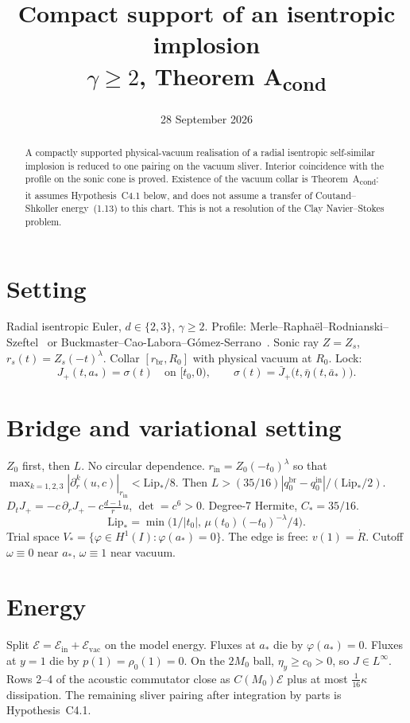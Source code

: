 \documentclass{amsart}
\title[Compact support of an isentropic implosion]{Compact support of an isentropic implosion\\
{\large $\gamma\ge 2$, Theorem A\textsubscript{cond}}}
\author{}
\date{28 September 2026}
\theoremstyle{plain}
\theoremstyle{definition}
\begin{document}
\begin{abstract}
A compactly supported physical-vacuum realisation of a radial isentropic
self-similar implosion is reduced to one pairing on the vacuum sliver.
Interior coincidence with the profile on the sonic cone is proved.
Existence of the vacuum collar is Theorem~A\textsubscript{cond}:
it assumes Hypothesis~C4.1 below, and does not assume a transfer of
Coutand--Shkoller energy~(1.13) to this chart.
This is not a resolution of the Clay Navier--Stokes problem.
\end{abstract}

\maketitle

\section{Setting}
Radial isentropic Euler, $d\in\{2,3\}$, $\gamma\ge 2$.
Profile: Merle--Rapha\"el--Rodnianski--Szeftel~\cite{MRRS2022}
or Buckmaster--Cao-Labora--\allowbreak G\'omez-Serrano~\cite{BCLGS2025}.
Sonic ray $Z=Z_s$, $r_s(t)=Z_s(-t)^\lambda$.
Collar $[r_{\mathrm{br}},R_0]$ with physical vacuum at $R_0$.
Lock:
\[
J_+(t,a_*)=\sigma(t)\quad\text{on }[t_0,0),\qquad
\sigma(t)=\bar J_+\bigl(t,\bar\eta(t,\bar a_*)\bigr).
\]

\section{Bridge and variational setting}
$Z_0$ first, then $L$. No circular dependence.
$r_{\mathrm{in}}=Z_0(-t_0)^\lambda$ so that
$\max_{k=1,2,3}|\partial_r^k(u,c)|_{r_{\mathrm{in}}}<\mathrm{Lip}_*/8$.
Then $L>(35/16)|q_0^{\mathrm{br}}-q_0^{\mathrm{in}}|/(\mathrm{Lip}_*/2)$.
$D_t J_+=-c\,\partial_r J_+-c\frac{d-1}{r}u$, $\det=c^6>0$.
Degree-7 Hermite, $C_*=35/16$.
\[
\mathrm{Lip}_*=\min\bigl(1/|t_0|,\,\mu(t_0)(-t_0)^{-\lambda}/4\bigr).
\]
Trial space $V_*=\{\varphi\in H^1(I):\varphi(a_*)=0\}$.
The edge is free: $v(1)=\dot R$.
Cutoff $\omega\equiv0$ near $a_*$, $\omega\equiv1$ near vacuum.

\section{Energy}
Split $\mathcal{E}=\mathcal{E}_{\mathrm{in}}+\mathcal{E}_{\mathrm{vac}}$ on the model energy.
Fluxes at $a_*$ die by $\varphi(a_*)=0$.
Fluxes at $y=1$ die by $p(1)=\rho_0(1)=0$.
On the $2M_0$ ball, $\eta_y\ge c_0>0$, so $J\in L^\infty$.
Rows 2--4 of the acoustic commutator close as $C(M_0)\mathcal{E}$ plus at most
$\tfrac1{16}\kappa$ dissipation.
The remaining sliver pairing after integration by parts is Hypothesis~C4.1.
\end{document}
